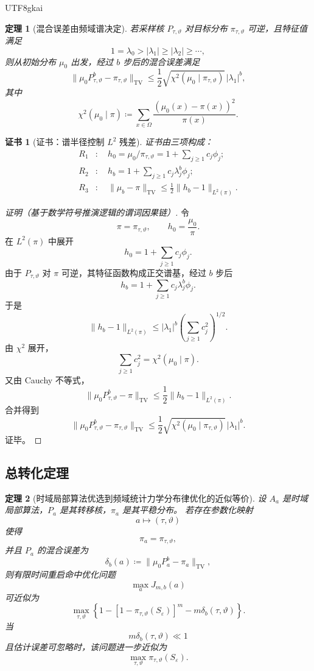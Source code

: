 \documentclass[12pt]{article}
\newtheorem{theorem}{定理}[section]
\newtheorem{Certificate}{证书}[section]
\newcommand{\DefEq}{\coloneqq}
\newcommand{\TV}{\mathrm{TV}}
\begin{document}
\begin{CJK*}{UTF8}{gkai}
\begin{theorem}[混合误差由频域谱决定]
\label{thm:tex55-spectral-mixing-law}
若采样核 \(P_{\tau,\vartheta}\) 对目标分布 \(\pi_{\tau,\vartheta}\) 可逆，且特征值满足
\[
  1=\lambda_0>
  |\lambda_1|\ge|\lambda_2|\ge\cdots,
\]
则从初始分布 \(\mu_0\) 出发，经过 \(b\) 步后的混合误差满足
\[
  \|\mu_0P_{\tau,\vartheta}^b-\pi_{\tau,\vartheta}\|_{\TV}
  \le
  \frac12
  \sqrt{\chi^2(\mu_0\mid\pi_{\tau,\vartheta})}\,
  |\lambda_1|^b,
\]
其中
\[
  \chi^2(\mu_0\mid\pi)
  \DefEq
  \sum_{x\in\Omega}
  \frac{(\mu_0(x)-\pi(x))^2}{\pi(x)}.
\]
\end{theorem}

\begin{Certificate}[证书：谱半径控制 \(L^2\) 残差]
\label{cert:tex55-spectral-mixing-law}
证书由三项构成：
\[
\begin{aligned}
  R_1&:\quad h_0=\mu_0/\pi_{\tau,\vartheta}
  =1+\sum_{j\ge1}c_j\phi_j;\\
  R_2&:\quad h_b=1+\sum_{j\ge1}c_j\lambda_j^b\phi_j;\\
  R_3&:\quad
  \|\mu_b-\pi\|_{\TV}\le
  \frac12\|h_b-1\|_{L^2(\pi)}.
\end{aligned}
\]
\end{Certificate}

\begin{proof}[证明（基于数学符号推演逻辑的谓词因果链）]
令
\[
  \pi=\pi_{\tau,\vartheta},
  \qquad
  h_0=\frac{\mu_0}{\pi}.
\]
在 \(L^2(\pi)\) 中展开
\[
  h_0=1+\sum_{j\ge1}c_j\phi_j.
\]
由于 \(P_{\tau,\vartheta}\) 对 \(\pi\) 可逆，其特征函数构成正交谱基，经过 \(b\) 步后
\[
  h_b=1+\sum_{j\ge1}c_j\lambda_j^b\phi_j.
\]
于是
\[
  \|h_b-1\|_{L^2(\pi)}
  \le
  |\lambda_1|^b
  \left(
  \sum_{j\ge1}c_j^2
  \right)^{1/2}.
\]
由 \(\chi^2\) 展开，
\[
  \sum_{j\ge1}c_j^2
  =
  \chi^2(\mu_0\mid\pi).
\]
又由 Cauchy 不等式，
\[
  \|\mu_0P_{\tau,\vartheta}^b-\pi\|_{\TV}
  \le
  \frac12\|h_b-1\|_{L^2(\pi)}.
\]
合并得到
\[
  \|\mu_0P_{\tau,\vartheta}^b-\pi_{\tau,\vartheta}\|_{\TV}
  \le
  \frac12
  \sqrt{\chi^2(\mu_0\mid\pi_{\tau,\vartheta})}\,
  |\lambda_1|^b.
\]
证毕。
\end{proof}

\subsection{总转化定理}
\label{subsec:tex55-total-selection-theorem}

\begin{theorem}[时域局部算法优选到频域统计力学分布律优化的近似等价]
\label{thm:tex55-local-selection-equivalence}
设 \(A_a\) 是时域局部算法，\(P_a\) 是其转移核，\(\pi_a\) 是其平稳分布。
若存在参数化映射
\[
  a\mapsto(\tau,\vartheta)
\]
使得
\[
  \pi_a=\pi_{\tau,\vartheta},
\]
并且 \(P_a\) 的混合误差为
\[
  \delta_b(a)
  \DefEq
  \|\mu_0P_a^b-\pi_a\|_{\TV},
\]
则有限时间重启命中优化问题
\[
  \max_a J_{m,b}(a)
\]
可近似为
\[
  \max_{\tau,\vartheta}
  \left\{
  1-
  \left[
  1-\pi_{\tau,\vartheta}(S_\varepsilon)
  \right]^m
  -
  m\delta_b(\tau,\vartheta)
  \right\}.
\]
当
\[
  m\delta_b(\tau,\vartheta)\ll1
\]
且估计误差可忽略时，该问题进一步近似为
\[
  \boxed{
  \max_{\tau,\vartheta}\pi_{\tau,\vartheta}(S_\varepsilon)
  }.
\]
\end{theorem}


\end{CJK*}
\end{document}
